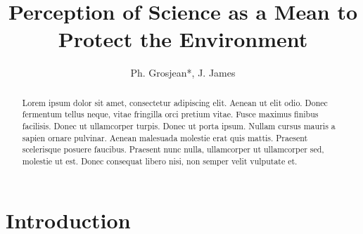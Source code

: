 \documentclass[Afour,times,sageh]{sagej}
\begin{document}

\title{Perception of Science as a Mean to Protect the Environment}


\author{Ph. Grosjean*, J. James}




\begin{abstract}
Lorem ipsum dolor sit amet, consectetur adipiscing elit. Aenean ut elit
odio. Donec fermentum tellus neque, vitae fringilla orci pretium vitae.
Fusce maximus finibus facilisis. Donec ut ullamcorper turpis. Donec ut
porta ipsum. Nullam cursus mauris a sapien ornare pulvinar. Aenean
malesuada molestie erat quis mattis. Praesent scelerisque posuere
faucibus. Praesent nunc nulla, ullamcorper ut ullamcorper sed, molestie
ut est. Donec consequat libero nisi, non semper velit vulputate et.
\end{abstract}


\maketitle

\hypertarget{introduction}{%
\section{Introduction}\label{introduction}}
\end{document}
